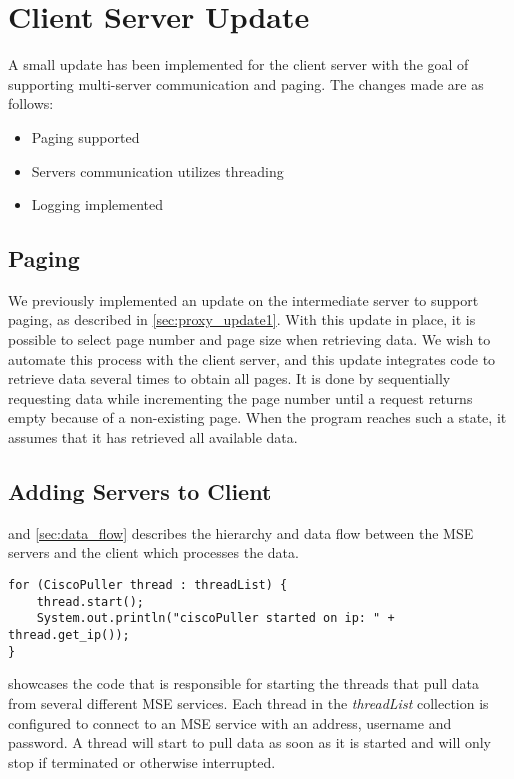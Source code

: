 \section{Client Server Update}
A small update has been implemented for the client server with the goal of supporting multi-server communication and paging. The changes made are as follows:

\begin{itemize}
\item Paging supported
\item Servers communication utilizes threading
\item Logging implemented
\end{itemize}

\subsection*{Paging}
We previously implemented an update on the intermediate server to support paging, as described in \cref{sec:proxy_update1}. With this update in place, it is possible to select page number and page size when retrieving data. We wish to automate this process with the client server, and this update integrates code to retrieve data several times to obtain all pages. It is done by sequentially requesting data while incrementing the page number until a request returns empty because of a non-existing page. When the program reaches such a state, it assumes that it has retrieved all available data.

\subsection*{Adding Servers to Client}
 and \cref{sec:data_flow} describes the hierarchy and data flow between the MSE servers and the client which processes the data. 
\begin{lstlisting}[caption={Starting threads to pull data from multiple MSE servers}, label={lst:cisco_puller}, language=inc_Java]
for (CiscoPuller thread : threadList) {
    thread.start();
    System.out.println("ciscoPuller started on ip: " + thread.get_ip());
}
\end{lstlisting}
 showcases the code that is responsible for starting the threads that pull data from several different MSE services. Each thread in the \textit{threadList} collection is configured to connect to an MSE service with an address, username and password. A thread will start to pull data as soon as it is started and will only stop if terminated or otherwise interrupted.

